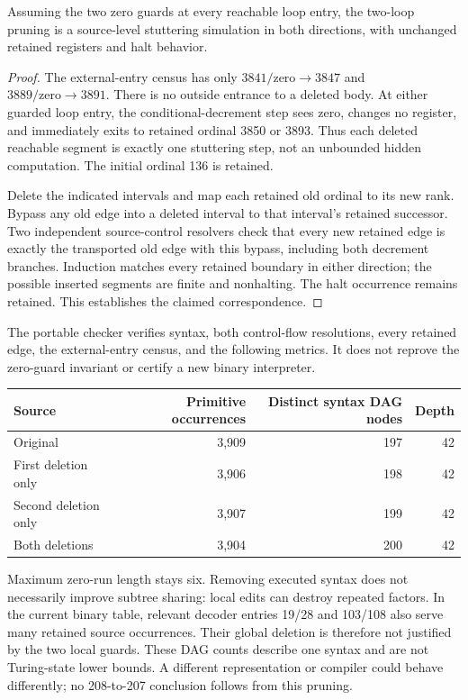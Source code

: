 \documentclass[11pt,letterpaper]{article}
\begin{document}
\begin{proposition}
Assuming the two zero guards at every reachable loop entry, the two-loop
pruning is a source-level stuttering simulation in both directions, with
unchanged retained registers and halt behavior.
\end{proposition}
\begin{proof}
The external-entry census has only $3841/\mathrm{zero}\to3847$ and
$3889/\mathrm{zero}\to3891$. There is no outside entrance to a deleted body.
At either guarded loop entry, the conditional-decrement step sees zero,
changes no register, and immediately exits to retained ordinal 3850 or 3893.
Thus each deleted reachable segment is exactly one stuttering step, not an
unbounded hidden computation. The initial ordinal 136 is retained.

Delete the indicated intervals and map each retained old ordinal to its new
rank. Bypass any old edge into a deleted interval to that interval's retained
successor. Two independent source-control resolvers check that every new
retained edge is exactly the transported old edge with this bypass, including
both decrement branches. Induction matches every retained boundary in either
direction; the possible inserted segments are finite and nonhalting. The
halt occurrence remains retained. This establishes the claimed correspondence.
\end{proof}
The portable checker verifies syntax, both control-flow resolutions, every
retained edge, the external-entry census, and the following metrics. It does
not reprove the zero-guard invariant or certify a new binary interpreter.
\begin{center}\begin{tabular}{lrrr}\toprule
Source & Primitive occurrences & Distinct syntax DAG nodes & Depth\\\midrule
Original & 3,909 & 197 & 42\\
First deletion only & 3,906 & 198 & 42\\
Second deletion only & 3,907 & 199 & 42\\
Both deletions & 3,904 & 200 & 42\\\bottomrule
\end{tabular}\end{center}
Maximum zero-run length stays six. Removing executed syntax does not necessarily
improve subtree sharing: local edits can destroy repeated factors. In the
current binary table, relevant decoder entries 19/28 and 103/108 also serve
many retained source occurrences. Their global deletion is therefore not
justified by the two local guards. These DAG counts describe one syntax and
are not Turing-state lower bounds. A different representation or compiler
could behave differently; no 208-to-207 conclusion follows from this pruning.
\end{document}
